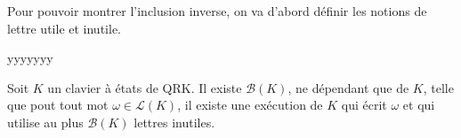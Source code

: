 \documentclass[12pt,a4paper]{article}
\renewcommand{\L}{\mathcal{L}}
\begin{document}
    Pour pouvoir montrer l'inclusion inverse, on va d'abord définir les notions de lettre utile et inutile.
    \begin{utiles}
            yyyyyyy
    \end{utiles}    
    \begin{inutilesbornés}
        Soit $K$ un clavier à états de QRK. Il existe $\mathcal{B}(K)$, ne dépendant que de $K$, telle que pout tout mot $\omega \in \L(K)$,
        il existe une exécution de $K$ qui écrit $\omega$ et qui utilise au plus $\mathcal{B}(K)$ lettres inutiles.
    \end{inutilesbornés}
\end{document}
